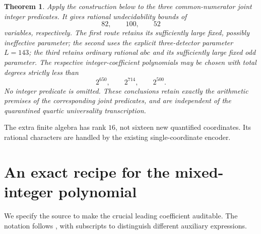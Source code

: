 \documentclass[11pt]{article}
\newtheorem{theorem}{Theorem}
\begin{document}
\begin{theorem}\label{main}
Apply the construction below to the three common-numerator joint
integer predicates.  It gives rational undecidability bounds of
\[
                 82,\qquad 100,\qquad 52
\]
variables, respectively.  The first route retains its sufficiently
large fixed, possibly ineffective parameter; the second uses the
explicit three-detector parameter \(L=143\); the third retains ordinary
rational \(abc\) and its sufficiently large fixed odd parameter.
The respective integer-coefficient polynomials may be chosen with
total degrees strictly less than
\[
                       2^{650},\qquad 2^{714},\qquad 2^{500}.
\]
No integer predicate is omitted.  These conclusions retain exactly the
arithmetic premises of the corresponding joint predicates, and are
independent of the quarantined quartic universality transcription.
\end{theorem}

The extra finite algebra has rank \(16\), not sixteen new quantified
coordinates.  Its rational characters are handled by the existing
single-coordinate encoder.

\section{An exact recipe for the mixed-integer polynomial}

We specify the source to make the crucial leading coefficient
auditable.  The notation follows \cite[Definitions 2.1, 4.1 and 5.3]{BDHMS},
with subscripts to distinguish different auxiliary expressions.
\end{document}
